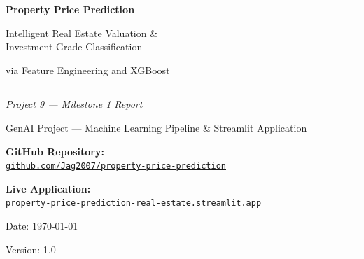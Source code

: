 \documentclass[12pt,a4paper]{article}
\begin{document}
\begin{titlepage}
    \centering
    \vspace*{1.5cm}

    {\Huge\bfseries\color{primaryblue} Property Price Prediction\par}
    \vspace{0.4cm}
    {\Large Intelligent Real Estate Valuation \&\\[4pt] Investment Grade Classification\par}
    \vspace{0.3cm}
    {\normalsize via Feature Engineering and XGBoost\par}

    \vspace{1.2cm}
    \rule{0.6\linewidth}{1pt}
    \vspace{1cm}

    {\large\itshape Project 9 --- Milestone 1 Report\par}
    \vspace{0.5cm}
    {\normalsize GenAI Project --- Machine Learning Pipeline \& Streamlit Application\par}

    \vspace{1.5cm}
    {\normalsize\textbf{GitHub Repository:}\\[4pt]
    \href{https://github.com/Jag2007/property-price-prediction}{\texttt{github.com/Jag2007/property-price-prediction}}\par}

    \vspace{0.6cm}
    {\normalsize\textbf{Live Application:}\\[4pt]
    \href{https://property-price-prediction-real-estate.streamlit.app/}{\texttt{property-price-prediction-real-estate.streamlit.app}}\par}

    \vspace{1.5cm}
    {\normalsize Date: \today \par}
    {\normalsize Version: 1.0\par}
\end{titlepage}
\end{document}
